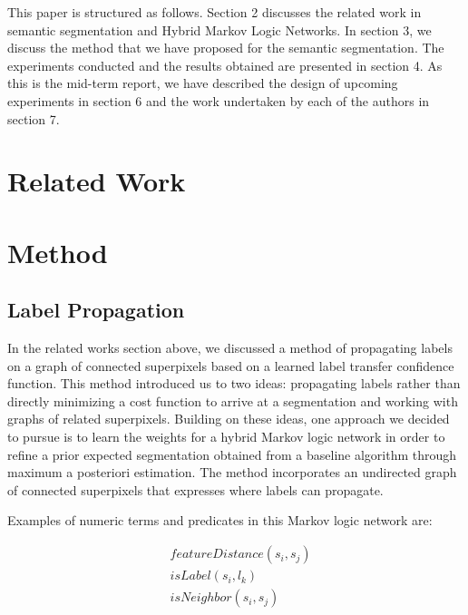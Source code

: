 \documentclass{article} %
\begin{document}
This paper is structured as follows. Section 2 discusses the related work in semantic segmentation and Hybrid Markov Logic Networks. In section 3, we discuss the method that we have proposed for the semantic segmentation. The experiments conducted and the results obtained are presented in section 4. As this is the mid-term report, we have described the design of upcoming experiments in section 6 and the work undertaken by each of the authors in section 7.  


\section{Related Work}


\section{Method}

\subsection{Label Propagation}
	In the related works section above, we discussed a method of propagating labels on a graph of connected superpixels based on a learned label transfer confidence function. This method introduced us to two ideas: propagating labels rather than directly minimizing a cost function to arrive at a segmentation and working with graphs of related superpixels. Building on these ideas, one approach we decided to pursue is to learn the weights for a hybrid Markov logic network in order to refine a prior expected segmentation obtained from a baseline algorithm through maximum a posteriori estimation. The method incorporates an undirected graph of connected superpixels that expresses where labels can propagate.

Examples of numeric terms and predicates in this Markov logic network are:

\begin{align*}
	&featureDistance(s_i,s_j)\\
	&isLabel(s_i,l_k) \\
	&isNeighbor(s_i,s_j)
\end{align*}
\end{document}
